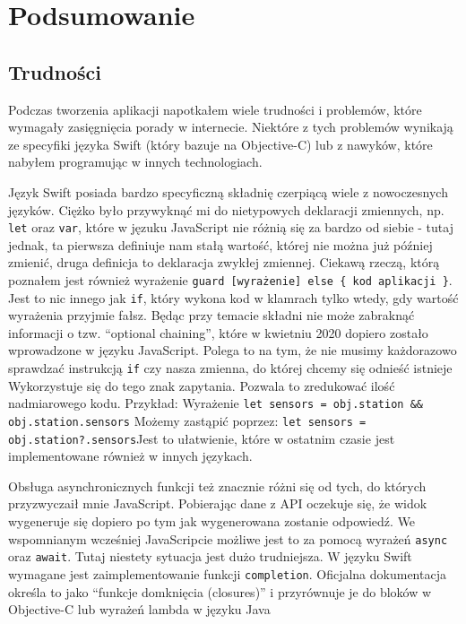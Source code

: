 \documentclass[a4paper,11pt,titlepage]{article}
\begin{document}
\section{Podsumowanie}
\subsection{Trudności}
Podczas tworzenia aplikacji napotkałem wiele trudności i problemów, które wymagały zasięgnięcia porady w internecie. Niektóre z tych problemów wynikają ze specyfiki języka Swift (który bazuje na Objective-C) lub z nawyków, które nabyłem programując w innych technologiach.

Język Swift posiada bardzo specyficzną składnię czerpiącą wiele z nowoczesnych języków. Ciężko było przywyknąć mi do nietypowych deklaracji zmiennych, np. \verb|let| oraz \verb|var|, które w jęzuku JavaScript nie różnią się za bardzo od siebie - tutaj jednak, ta pierwsza definiuje nam stałą wartość, której nie można już później zmienić, druga definicja to deklaracja zwykłej zmiennej. Ciekawą rzeczą, którą poznałem jest również wyrażenie \newline \verb|guard [wyrażenie] else { kod aplikacji }|. Jest to nic innego jak \verb|if|, który wykona kod w klamrach tylko wtedy, gdy wartość wyrażenia przyjmie fałsz. Będąc przy temacie składni nie może zabraknąć informacji o tzw. ``optional chaining'', które w kwietniu 2020 dopiero zostało wprowadzone w języku JavaScript. Polega to na tym, że nie musimy każdorazowo sprawdzać instrukcją \verb|if| czy nasza zmienna, do której chcemy się odnieść istnieje Wykorzystuje się do tego znak zapytania. Pozwala to zredukować ilość nadmiarowego kodu. Przykład:\newline
Wyrażenie \verb|let sensors = obj.station && obj.station.sensors| \newline
Możemy zastąpić poprzez: \verb|let sensors = obj.station?.sensors|\newline Jest to ułatwienie, które w ostatnim czasie jest implementowane również w innych językach.


Obsługa asynchronicznych funkcji też znacznie różni się od tych, do których przyzwyczaił mnie JavaScript. Pobierając dane z API oczekuje się, że widok wygeneruje się dopiero po tym jak wygenerowana zostanie odpowiedź. We wspomnianym wcześniej JavaScripcie możliwe jest to za pomocą wyrażeń \verb|async| oraz \verb|await|. Tutaj niestety sytuacja jest dużo trudniejsza. W języku Swift wymagane jest zaimplementowanie funkcji \verb|completion|. Oficjalna dokumentacja określa to jako ``funkcje domknięcia (closures)'' i przyrównuje je do bloków w Objective-C lub wyrażeń lambda w języku Java  
\end{document}
